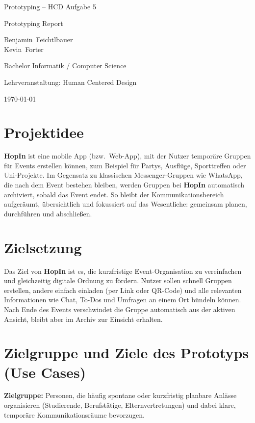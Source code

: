 \documentclass[11pt,a4paper]{article}
\newcommand{\appname}{\textbf{HopIn}}
\begin{document}
\begin{titlepage}
  \centering
  \vspace*{2cm}
  {\Huge Prototyping – HCD Aufgabe 5\par}
  \vspace{0.8cm}
  {\Large Prototyping Report\par}
  \vspace{2.0cm}
  {\large Benjamin~Feichtlbauer\\Kevin~Forter\par}
  {\large Bachelor Informatik / Computer Science\par}
  {\large Lehrveranstaltung: Human Centered Design\par}
  {\large \today\par}
\end{titlepage}

\section*{Projektidee}
\appname{} ist eine mobile App (bzw.\ Web-App), mit der Nutzer temporäre Gruppen für Events erstellen können, zum Beispiel für Partys, Ausflüge, Sporttreffen oder Uni-Projekte.
Im Gegensatz zu klassischen Messenger-Gruppen wie WhatsApp, die nach dem Event bestehen bleiben, werden Gruppen bei \appname{} automatisch archiviert, sobald das Event endet.
So bleibt der Kommunikationsbereich aufgeräumt, übersichtlich und fokussiert auf das Wesentliche: gemeinsam planen, durchführen und abschließen.

\section*{Zielsetzung}
Das Ziel von \appname{} ist es, die kurzfristige Event-Organisation zu vereinfachen und gleichzeitig digitale Ordnung zu fördern.
Nutzer sollen schnell Gruppen erstellen, andere einfach einladen (per Link oder QR-Code) und alle relevanten Informationen wie Chat, To-Dos und Umfragen an einem Ort bündeln können.
Nach Ende des Events verschwindet die Gruppe automatisch aus der aktiven Ansicht, bleibt aber im Archiv zur Einsicht erhalten.

\section*{Zielgruppe und Ziele des Prototyps (Use Cases)}
\textbf{Zielgruppe:} Personen, die häufig spontane oder kurzfristig planbare Anlässe organisieren (Studierende, Berufstätige, Elternvertretungen) und dabei klare, temporäre Kommunikationsräume bevorzugen.
\end{document}

